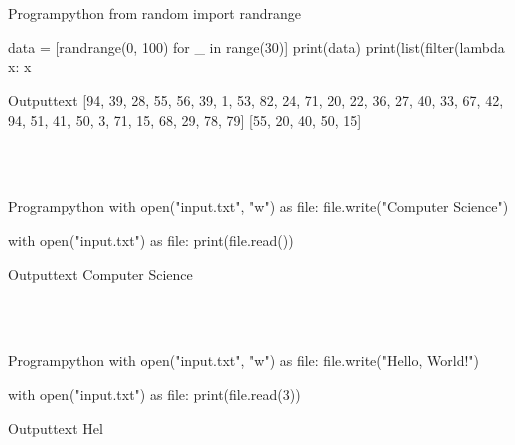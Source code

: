 \documentclass[11pt]{ipu-python}
\begin{document}
    \\~\\
    \begin{code}
        {Program}{python}
from random import randrange

data = [randrange(0, 100) for _ in range(30)]
print(data)
print(list(filter(lambda x: x %
    \end{code}
    \begin{code}
        {Output}{text}
[94, 39, 28, 55, 56, 39, 1, 53, 82, 24, 71, 20, 22, 36, 27, 40, 33, 67, 42, 94, 51, 41, 50, 3, 71, 15, 68, 29, 78, 79]
[55, 20, 40, 50, 15]
    \end{code}

    \\~\\
    \begin{code}
        {Program}{python}
with open("input.txt", "w") as file:
    file.write("Computer Science")

with open("input.txt") as file:
    print(file.read())
    \end{code}
    \begin{code}
        {Output}{text}
Computer Science
    \end{code}

    \\~\\
    \begin{code}
        {Program}{python}
with open("input.txt", "w") as file:
    file.write("Hello, World!")

with open("input.txt") as file:
    print(file.read(3))
    \end{code}
    \begin{code}
        {Output}{text}
Hel
    \end{code}
    \newpage
\end{document}
